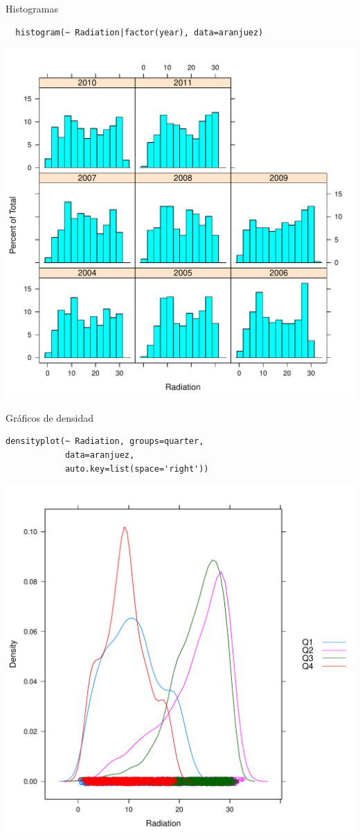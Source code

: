 \documentclass[xcolor={usenames,svgnames,dvipsnames}]{beamer}
\begin{document}
\begin{frame}[fragile,label=sec-6-1-26]{Histogramas}
 \lstset{language=R,label= ,caption= ,numbers=none}
\begin{lstlisting}
  histogram(~ Radiation|factor(year), data=aranjuez)
\end{lstlisting}
\end{frame}

\begin{frame}[label=sec-6-1-27]{}
\includegraphics[width=.9\linewidth]{figs/histogram.pdf}
\end{frame}

\begin{frame}[fragile,label=sec-6-1-28]{Gráficos de densidad}
 \lstset{language=R,label= ,caption= ,numbers=none}
\begin{lstlisting}
densityplot(~ Radiation, groups=quarter,
            data=aranjuez,
            auto.key=list(space='right'))
\end{lstlisting}
\end{frame}

\begin{frame}[label=sec-6-1-29]{}
\includegraphics[width=.9\linewidth]{figs/density.pdf}
\end{frame}
\end{document}
